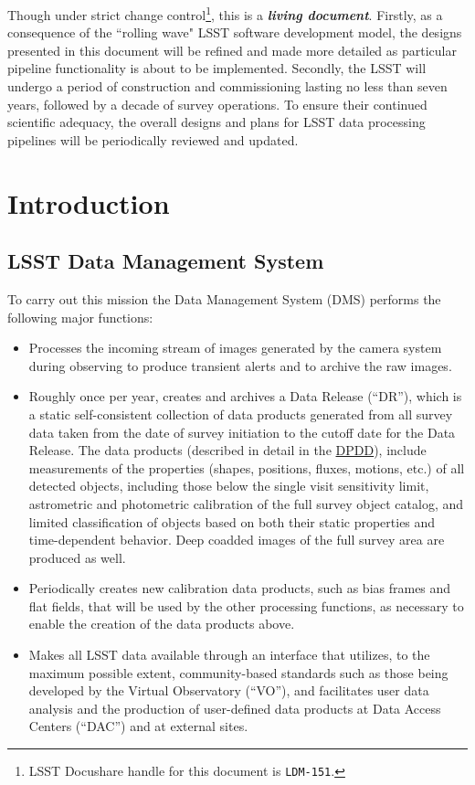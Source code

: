 \documentclass[12pt]{article}
\newcommand{\ds}[2]{{\color{blue} \href{https://docushare.lsstcorp.org/docushare/dsweb/Get/#1}{#2}}\xspace}
\newcommand{\DPDD}{\ds{LSE-163}{DPDD}}
\begin{document}
Though under strict change control\footnote{LSST Docushare handle for this document is {\tt LDM-151}.}, this is a {\bf \em living document}. Firstly, as a consequence of the ``rolling wave" LSST software development model, the designs presented in this document will be refined and made more detailed as particular pipeline functionality is about to be implemented. Secondly, the LSST will undergo a period of construction and commissioning lasting no less than seven years, followed by a decade of survey operations. To ensure their continued scientific adequacy, the overall designs and plans for LSST data processing pipelines will be periodically reviewed and updated.

\clearpage

\section{Introduction}

\subsection{LSST Data Management System}

To carry out this mission the Data Management System (DMS) performs the following major functions:

\begin{itemize}
\item Processes the incoming stream of images generated by the camera
  system during observing to produce transient alerts and to archive
  the raw images.

\item Roughly once per year, creates and archives a Data Release (``DR''),
  which is a static self-consistent collection of data products
  generated from all survey data taken from the date of survey
  initiation to the cutoff date for the Data Release. The data
  products (described in detail in the \DPDD), include measurements of 
  the properties (shapes, positions, fluxes, motions, etc.) of all detected
  objects, including those below the single visit sensitivity limit,
  astrometric and photometric calibration of the full survey object
  catalog, and limited classification of objects based on both their
  static properties and time-dependent behavior.  Deep coadded images
  of the full survey area are produced as well.

\item Periodically creates new calibration data products, such as bias
  frames and flat fields, that will be used by the other processing
  functions, as necessary to enable the creation of the data products above.

\item Makes all LSST data available through an interface that
  utilizes, to the maximum possible extent, community-based standards
  such as those being developed by the Virtual Observatory (``VO''), and
  facilitates user data analysis and the production of user-defined
  data products at Data Access Centers (``DAC'') and at external sites.
\end{itemize}
\end{document}
